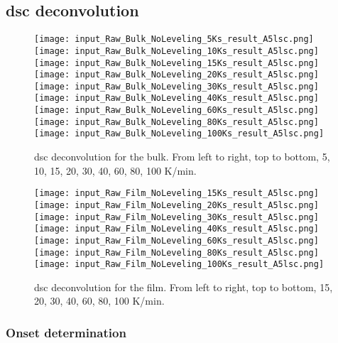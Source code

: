 \documentclass[draft,a4paper,12pt,oneside]{article}%
\begin{document}
\subsection{\acrshort{dsc} deconvolution}

\begin{figure}[b]
	\centering
	\texttt{[image: input\_Raw\_Bulk\_NoLeveling\_5Ks\_result\_A5lsc.png]}\quad
	\texttt{[image: input\_Raw\_Bulk\_NoLeveling\_10Ks\_result\_A5lsc.png]}\quad
	\texttt{[image: input\_Raw\_Bulk\_NoLeveling\_15Ks\_result\_A5lsc.png]}
	\medskip
	\texttt{[image: input\_Raw\_Bulk\_NoLeveling\_20Ks\_result\_A5lsc.png]}\quad
	\texttt{[image: input\_Raw\_Bulk\_NoLeveling\_30Ks\_result\_A5lsc.png]}\quad
	\texttt{[image: input\_Raw\_Bulk\_NoLeveling\_40Ks\_result\_A5lsc.png]}
	\medskip
	\texttt{[image: input\_Raw\_Bulk\_NoLeveling\_60Ks\_result\_A5lsc.png]}\quad
	\texttt{[image: input\_Raw\_Bulk\_NoLeveling\_80Ks\_result\_A5lsc.png]}\quad
	\texttt{[image: input\_Raw\_Bulk\_NoLeveling\_100Ks\_result\_A5lsc.png]}
	\caption{\acrshort{dsc} deconvolution for the bulk. From left to right, top to bottom, 5, 10, 15, 20, 30, 40, 60, 80, 100 K/min.}
	\label{fig:DSC_Bulk_Decon}
\end{figure}

\begin{figure}[b]
	\centering
	\texttt{[image: input\_Raw\_Film\_NoLeveling\_15Ks\_result\_A5lsc.png]}\quad
	\texttt{[image: input\_Raw\_Film\_NoLeveling\_20Ks\_result\_A5lsc.png]}\quad
	\texttt{[image: input\_Raw\_Film\_NoLeveling\_30Ks\_result\_A5lsc.png]}
	\medskip
	\texttt{[image: input\_Raw\_Film\_NoLeveling\_40Ks\_result\_A5lsc.png]}\quad
	\texttt{[image: input\_Raw\_Film\_NoLeveling\_60Ks\_result\_A5lsc.png]}\quad
	\texttt{[image: input\_Raw\_Film\_NoLeveling\_80Ks\_result\_A5lsc.png]}
	\medskip
	\texttt{[image: input\_Raw\_Film\_NoLeveling\_100Ks\_result\_A5lsc.png]}
	\caption{\acrshort{dsc} deconvolution for the film. From left to right, top to bottom, 15, 20, 30, 40, 60, 80, 100 K/min.}
	\label{fig:DSC_Film_Decon}
\end{figure}

\subsubsection{Onset determination}
\end{document}
